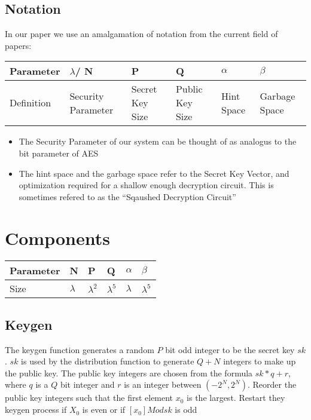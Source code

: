 \documentclass[letterpaper,11pt]{article} %
\begin{document}
\subsection{Notation}
In our paper we use an amalgamation of notation from the current field of papers:


\begin{center}
\begin{tabular}{ l | l | l | l | l | l }
\hline
Parameter & $\lambda$/ N & P & Q & $\alpha$ & $\beta$ \\ \hline
Definition & Security Parameter & Secret Key Size   & Public Key Size & Hint Space & Garbage Space  \\ \hline
\end{tabular}
\end{center}

\begin{itemize}
\item The Security Parameter of our system  can be thought of as analogus to the bit parameter of AES
\item The hint space and the garbage space refer to the Secret Key Vector, and optimization required for a shallow enough decryption circuit. This is sometimes refered to as the ``Sqaushed Decryption Circuit'' 
\end{itemize}

\section*{Components}





\begin{center}
\begin{tabular}{  l | l | l | l | l | l }
\hline
Parameter & N & P & Q & $\alpha$ & $\beta$ \\ \hline
Size &  $\lambda$ & $\lambda ^2$  & $\lambda ^5$ & $\lambda$ & $\lambda ^5$  \\ \hline
\end{tabular}
\end{center}

\subsection*{Keygen}
The keygen function generates a random $P$ bit odd integer to be the secret key $sk$. $sk$ is used by the distribution function to generate $Q + N$ integers to make up the public key. The public key integers are chosen from
the formula $sk * q + r$, where $q$ is a $Q$ bit integer and $r$ is an integer between $(-2^N, 2^N).$ Reorder the public key integers such that the first element $x_0$ is the largest. Restart they keygen process if $X_0$ is even or if $[x_0] Mod sk$ is odd  \\
\end{document}
